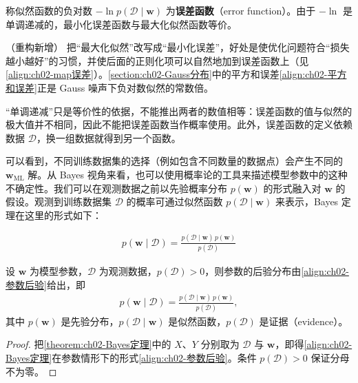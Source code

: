 \documentclass[../../main.tex]{subfiles}
\begin{document}
\begin{definition}[误差函数]\label{definition:ch02-误差函数}
称似然函数的负对数 $-\ln p(\mathcal{D}\mid\mathbf{w})$ 为\textbf{误差函数}（error function）。由于 $-\ln$ 是单调递减的，最小化误差函数与最大化似然函数等价。
\end{definition}

\begin{remark}（重构新增）
把“最大化似然”改写成“最小化误差”，好处是使优化问题符合“损失越小越好”的习惯，并使后面的正则化项可以自然地加到误差函数上（见\eqref{align:ch02-map误差}）。\cref{section:ch02-Gauss分布}中的平方和误差\eqref{align:ch02-平方和误差}正是 Gauss 噪声下负对数似然的常数倍。

“单调递减”只是等价性的依据，不能推出两者的数值相等：误差函数的值与似然的极大值并不相同，因此不能把误差函数当作概率使用。此外，误差函数的定义依赖数据 $\mathcal{D}$，换一组数据就得到另一个函数。
\end{remark}

可以看到，不同训练数据集的选择（例如包含不同数量的数据点）会产生不同的 $\mathbf{w}_{\mathrm{ML}}$ 解。从 Bayes 视角来看，也可以使用概率论的工具来描述模型参数中的这种不确定性。我们可以在观测数据之前以先验概率分布 $p(\mathbf{w})$ 的形式融入对 $\mathbf{w}$ 的假设。观测到训练数据集 $\mathcal{D}$ 的概率可通过似然函数 $p(\mathcal{D}\mid\mathbf{w})$ 来表示，Bayes 定理在这里的形式如下：

\begin{align}
  p(\mathbf{w}\mid\mathcal{D}) = \frac{p(\mathcal{D}\mid\mathbf{w})\,p(\mathbf{w})}{p(\mathcal{D})}
  \label{align:ch02-参数后验}
\end{align}

\begin{theorem}\label{theorem:ch02-参数Bayes}
设 $\mathbf{w}$ 为模型参数，$\mathcal{D}$ 为观测数据，$p(\mathcal{D})>0$，则参数的后验分布由\eqref{align:ch02-参数后验}给出，即
\begin{align*}
  p(\mathbf{w}\mid\mathcal{D}) = \frac{p(\mathcal{D}\mid\mathbf{w})\,p(\mathbf{w})}{p(\mathcal{D})} ,
\end{align*}
其中 $p(\mathbf{w})$ 是先验分布，$p(\mathcal{D}\mid\mathbf{w})$ 是似然函数，$p(\mathcal{D})$ 是证据（evidence）。
\end{theorem}

\begin{proof}
把\cref{theorem:ch02-Bayes定理}中的 $X$、$Y$ 分别取为 $\mathcal{D}$ 与 $\mathbf{w}$，即得\eqref{align:ch02-Bayes定理}在参数情形下的形式\eqref{align:ch02-参数后验}。条件 $p(\mathcal{D})>0$ 保证分母不为零。
\end{proof}
\end{document}
